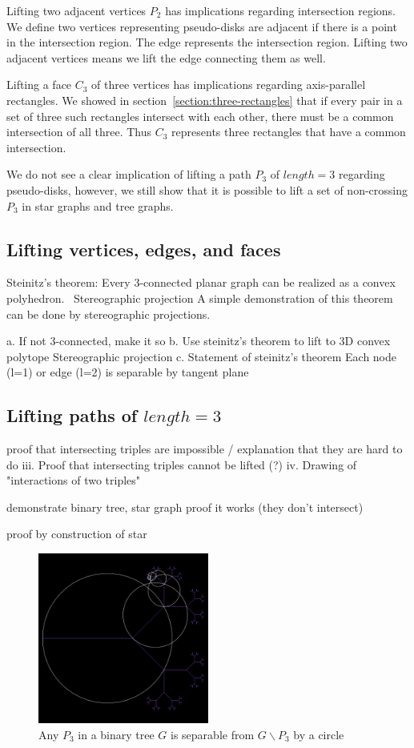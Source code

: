 \documentclass{NSF}
\begin{document}
Lifting two adjacent vertices $P_2$ has implications regarding intersection regions. We define two vertices representing pseudo-disks are adjacent if there is a point in the intersection region. The edge represents the intersection region. Lifting two adjacent vertices means we lift the edge connecting them as well.

Lifting a face $C_3$ of three vertices has implications regarding axis-parallel rectangles. We showed in section~\ref{section:three-rectangles} that if every pair in a set of three such rectangles intersect with each other, there must be a common intersection of all three. Thus $C_3$ represents three rectangles that have a common intersection.

We do not see a clear implication of lifting a path $P_3$ of $length=3$ regarding pseudo-disks, however, we still show that it is possible to lift a set of non-crossing $P_3$ in star graphs and tree graphs.


\subsection{Lifting vertices, edges, and faces}
Steinitz's theorem: Every 3-connected planar graph can be realized as a convex polyhedron.
~Stereographic projection
A simple demonstration of this theorem can be done by stereographic projections.

		a. If not 3-connected, make it so
		b. Use steinitz's theorem to lift to 3D convex polytope Stereographic projection
		c. Statement of steinitz's theorem
Each node (l=1) or edge (l=2) is separable by tangent plane

\subsection{Lifting paths of \texorpdfstring{$length=3$}{length=3}}
proof that intersecting triples are impossible / explanation that they are hard to do
			iii. Proof that intersecting triples cannot be lifted (?) 
			iv. Drawing of "interactions of two triples"

demonstrate binary tree, star graph
proof it works (they don't intersect)

proof by construction of star
\begin{figure}
\centering

\includegraphics[width=0.5\textwidth]{images/binary-tree-with-circles}
\caption{Any $P_3$ in a binary tree $G$ is separable from $G\backslash P_3$ by a circle}
\end{figure}
\end{document}

